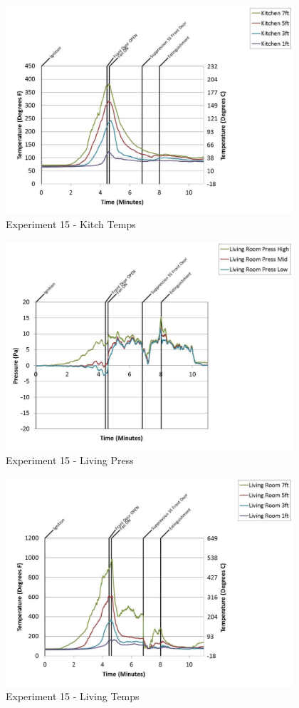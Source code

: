 \documentclass{article}
\begin{document}
\begin{appendices}
	\clearpage

	\begin{figure}[h!]
		\centering
		\includegraphics[height=3.05in]{0_Images/Results_Charts/Exp_15_Charts/KitchTemps.pdf}
		\caption{Experiment 15 - Kitch Temps}
	\end{figure}
 

	\begin{figure}[h!]
		\centering
		\includegraphics[height=3.05in]{0_Images/Results_Charts/Exp_15_Charts/LivingPress.pdf}
		\caption{Experiment 15 - Living Press}
	\end{figure}
 
	\clearpage

	\begin{figure}[h!]
		\centering
		\includegraphics[height=3.05in]{0_Images/Results_Charts/Exp_15_Charts/LivingTemps.pdf}
		\caption{Experiment 15 - Living Temps}
	\end{figure}
 


\end{appendices}
\end{document}

